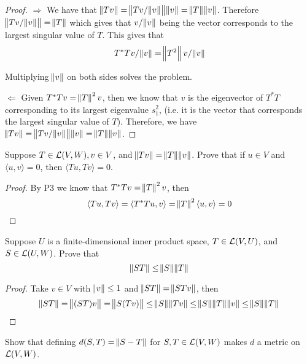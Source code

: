 \documentclass{extarticle}
\begin{document}
\begin{proof}
\(\Rightarrow\) We have that 
\(\norm{Tv} = \norm{Tv / \norm{v}} \norm{v} = \norm{T} \norm{v}\). 
Therefore \(\norm{Tv / \norm{v}} = \norm{T}\) which 
gives that \(v/\norm{v}\) being the vector corresponds to the largest 
singular value of \(T\). This gives that  
\[T^*T v/\norm{v} = \norm{T^2}v / \norm{v}\]

Multiplying \(\norm{v}\) on both sides solves the problem. 

\(\Leftarrow\) Given \(T^*Tv = \norm{T}^2 v\), then we know 
that \(v\) is the eigenvector of \(T^*T\) corresponding to 
its largest eigenvalue \(s_1^2\), (i.e. it is the vector 
that corresponds the largest singular value of \(T\)). 
Therefore, we have \(\norm{Tv} =
\norm{Tv / \norm{v}} \norm{v}= \norm{T} \norm{v}\). 
\end{proof}

\begin{problem}{4}
    Suppose \(T \in \mathcal{L}(V, W), v \in V\), and 
    \(\norm{Tv} = \norm{T} \norm{v}\). Prove that if 
    \(u \in V\) and \(\langle u,v \rangle = 0\), then 
    \(\langle Tu,Tv \rangle = 0\).  
\end{problem}

\begin{proof}
By P3 we know that \(T^*T v = \norm{T}^2 v\), then 
\[\langle Tu,Tv \rangle 
= \langle T^*Tu,v \rangle = \norm{T}^2 \langle u,v \rangle = 0\]
\end{proof}

\begin{problem}{5}
    Suppose \(U\) is a finite-dimensional inner product 
    space, \(T \in \mathcal{L}(V, U)\), and \(S \in \mathcal{L}(U, W)\).  
    Prove that 
    \[\norm{ST} \leq \norm{S} \norm{T}\]
\end{problem}

\begin{proof}
Take \(v \in V\) with \(\norm{v} \leq 1\) and 
\(\norm{ST} = \norm{ST v}\), then 
\begin{align*}
    \norm{ST} 
    = \norm{(ST)v} 
    = \norm{S(Tv)} 
    \leq \norm{S}\norm{Tv} 
    \leq \norm{S} \norm{T} \norm{v} 
    \leq \norm{S} \norm{T}
\end{align*}
\end{proof}

\begin{problem}{7}
    Show that defining \(d(S, T) = \norm{S - T}\) for 
    \(S, T \in \mathcal{L}(V, W)\) makes \(d\) a metric on 
    \(\mathcal{L}(V, W)\).  
\end{problem}
\end{document}
